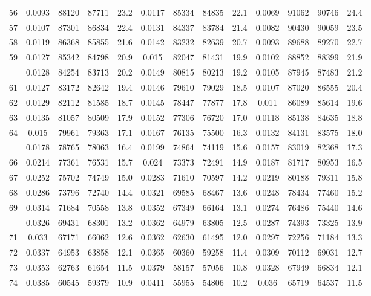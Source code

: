 \documentclass[
  14pt,
]{article}
\begin{document}
\begin{longtable}[t]{lcccccccccccc}
56 & 0.0093 & 88120 & 87711 & 23.2 & 0.0117 & 85334 & 84835 & 22.1 & 0.0069 & 91062 & 90746 & 24.4\\
57 & 0.0107 & 87301 & 86834 & 22.4 & 0.0131 & 84337 & 83784 & 21.4 & 0.0082 & 90430 & 90059 & 23.5\\
58 & 0.0119 & 86368 & 85855 & 21.6 & 0.0142 & 83232 & 82639 & 20.7 & 0.0093 & 89688 & 89270 & 22.7\\
59 & 0.0127 & 85342 & 84798 & 20.9 & 0.015 & 82047 & 81431 & 19.9 & 0.0102 & 88852 & 88399 & 21.9\\
\addlinespace
60 & 0.0128 & 84254 & 83713 & 20.2 & 0.0149 & 80815 & 80213 & 19.2 & 0.0105 & 87945 & 87483 & 21.2\\
61 & 0.0127 & 83172 & 82642 & 19.4 & 0.0146 & 79610 & 79029 & 18.5 & 0.0107 & 87020 & 86555 & 20.4\\
62 & 0.0129 & 82112 & 81585 & 18.7 & 0.0145 & 78447 & 77877 & 17.8 & 0.011 & 86089 & 85614 & 19.6\\
63 & 0.0135 & 81057 & 80509 & 17.9 & 0.0152 & 77306 & 76720 & 17.0 & 0.0118 & 85138 & 84635 & 18.8\\
64 & 0.015 & 79961 & 79363 & 17.1 & 0.0167 & 76135 & 75500 & 16.3 & 0.0132 & 84131 & 83575 & 18.0\\
\addlinespace
65 & 0.0178 & 78765 & 78063 & 16.4 & 0.0199 & 74864 & 74119 & 15.6 & 0.0157 & 83019 & 82368 & 17.3\\
66 & 0.0214 & 77361 & 76531 & 15.7 & 0.024 & 73373 & 72491 & 14.9 & 0.0187 & 81717 & 80953 & 16.5\\
67 & 0.0252 & 75702 & 74749 & 15.0 & 0.0283 & 71610 & 70597 & 14.2 & 0.0219 & 80188 & 79311 & 15.8\\
68 & 0.0286 & 73796 & 72740 & 14.4 & 0.0321 & 69585 & 68467 & 13.6 & 0.0248 & 78434 & 77460 & 15.2\\
69 & 0.0314 & 71684 & 70558 & 13.8 & 0.0352 & 67349 & 66164 & 13.1 & 0.0274 & 76486 & 75440 & 14.6\\
\addlinespace
70 & 0.0326 & 69431 & 68301 & 13.2 & 0.0362 & 64979 & 63805 & 12.5 & 0.0287 & 74393 & 73325 & 13.9\\
71 & 0.033 & 67171 & 66062 & 12.6 & 0.0362 & 62630 & 61495 & 12.0 & 0.0297 & 72256 & 71184 & 13.3\\
72 & 0.0337 & 64953 & 63858 & 12.1 & 0.0365 & 60360 & 59258 & 11.4 & 0.0309 & 70112 & 69031 & 12.7\\
73 & 0.0353 & 62763 & 61654 & 11.5 & 0.0379 & 58157 & 57056 & 10.8 & 0.0328 & 67949 & 66834 & 12.1\\
74 & 0.0385 & 60545 & 59379 & 10.9 & 0.0411 & 55955 & 54806 & 10.2 & 0.036 & 65719 & 64537 & 11.5\\

\end{longtable}
\end{document}
